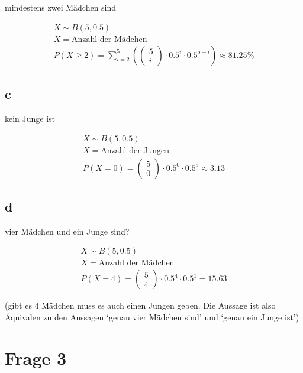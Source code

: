 mindestens zwei Mädchen sind

\begin{align*}
    X \sim B(5, 0.5) \\
    X = \text{Anzahl der Mädchen} \\
    P(X \geq 2) = \sum_{i = 2}^{5} \left(\begin{pmatrix}
        5 \\ i
    \end{pmatrix} \cdot 0.5^i \cdot 0.5^{5 - i}\right) \approx 81.25\%
\end{align*}

\subsection{c}

kein Junge ist

\begin{align*}
    X \sim B(5, 0.5) \\
    X = \text{Anzahl der Jungen} \\
    P(X = 0) = \begin{pmatrix}
        5 \\ 0
    \end{pmatrix} \cdot 0.5^0 \cdot 0.5^5 \approx 3.13
\end{align*}

\subsection{d}

vier Mädchen und ein Junge sind? 

\begin{align*}
    X \sim B(5, 0.5) \\
    X = \text{Anzahl der Mädchen} \\
    P(X = 4) = \begin{pmatrix}
        5 \\ 4
    \end{pmatrix} \cdot 0.5^4 \cdot 0.5^1 = 15.63
\end{align*}

(gibt es 4 Mädchen muss es auch einen Jungen geben. Die Aussage ist also Äquivalen zu den Aussagen `genau vier Mädchen sind' und `genau ein Junge ist')

\section{Frage 3}

